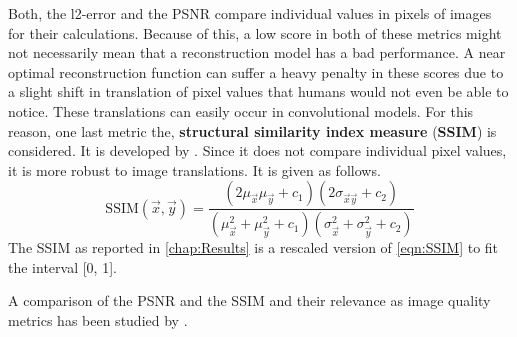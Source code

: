 Both, the l2-error and the PSNR compare individual values in pixels of images for their calculations.
Because of this, a low score in both of these metrics might not necessarily mean that a reconstruction
model has a bad performance. A near optimal reconstruction function can suffer a heavy penalty
in these scores due to a slight shift in translation of pixel values that humans would not even be
able to notice.
These translations can easily occur in convolutional models.
For this reason, one last metric the, \textbf{structural similarity index measure} (\textbf{SSIM})
is considered. It is developed by \cite{SSIM}. Since it does not compare individual pixel values, it is more robust to 
image translations.
It is given as follows.
\begin{equation}
\label{eqn:SSIM}   
    \text{SSIM}(\vec x, \vec y) 
    = \frac {(2 \mu_{\vec x} \mu_{\vec y} + c_1)(2\sigma_{\vec x\vec y} + c_2)}
    {(\mu_{\vec x}^2 + \mu_{\vec y}^2 + c_1)(\sigma_{\vec x}^2 + \sigma_{\vec y}^2 + c_2)}
\end{equation}
The SSIM as reported in \cref{chap:Results} is a rescaled version of \cref{eqn:SSIM}
to fit the interval [0, 1].


A comparison of the PSNR and the SSIM and their relevance as image quality metrics has been studied by \cite{PSNRvsSSIM}.
